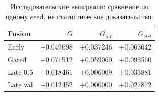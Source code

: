 \begin{table}[H]\centering\small
\setlength{\tabcolsep}{4pt}
\caption{Исследовательские выигрыши: сравнение по одному seed, не статистическое доказательство.}\label{tab:gains}
\begin{tabular}{lrrr}
\toprule
Fusion & $G$ & $G_{int}$ & $G_{ctrl}$ \\
\midrule
Early & +0.049698 & +0.037246 & +0.063642 \\
Gated & +0.071512 & +0.059060 & +0.093560 \\
Late 0.5 & +0.018461 & +0.006009 & +0.033881 \\
Late val & +0.012452 & +0.000000 & +0.027872 \\
\bottomrule
\end{tabular}
\end{table}
